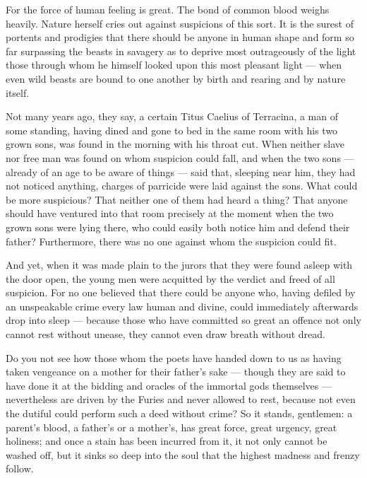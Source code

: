  For the force of human feeling is great. The bond of common blood weighs heavily. Nature herself cries out against suspicions of this sort. It is the surest of portents and prodigies that there should be anyone in human shape and form so far surpassing the beasts in savagery as to deprive most outrageously of the light those through whom he himself looked upon this most pleasant light --- when even wild beasts are bound to one another by birth and rearing and by nature itself.

 Not many years ago, they say, a certain Titus Caelius of Terracina, a man of some standing, having dined and gone to bed in the same room with his two grown sons, was found in the morning with his throat cut. When neither slave nor free man was found on whom suspicion could fall, and when the two sons --- already of an age to be aware of things --- said that, sleeping near him, they had not noticed anything, charges of parricide were laid against the sons. What could be more suspicious? That neither one of them had heard a thing? That anyone should have ventured into that room precisely at the moment when the two grown sons were lying there, who could easily both notice him and defend their father? Furthermore, there was no one against whom the suspicion could fit.

 And yet, when it was made plain to the jurors that they were found asleep with the door open, the young men were acquitted by the verdict and freed of all suspicion. For no one believed that there could be anyone who, having defiled by an unspeakable crime every law human and divine, could immediately afterwards drop into sleep --- because those who have committed so great an offence not only cannot rest without unease, they cannot even draw breath without dread.

 Do you not see how those whom the poets have handed down to us as having taken vengeance on a mother for their father's sake --- though they are said to have done it at the bidding and oracles of the immortal gods themselves --- nevertheless are driven by the Furies and never allowed to rest, because not even the dutiful could perform such a deed without crime? So it stands, gentlemen: a parent's blood, a father's or a mother's, has great force, great urgency, great holiness; and once a stain has been incurred from it, it not only cannot be washed off, but it sinks so deep into the soul that the highest madness and frenzy follow.


